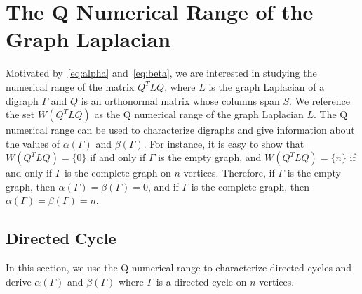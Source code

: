 \documentclass{article}
\theoremstyle{definition}
\begin{document}
\section{The Q Numerical Range of the Graph Laplacian}
Motivated by~\eqref{eq:alpha} and~\eqref{eq:beta}, we are interested in studying the numerical range of the matrix $Q^{T}LQ$, where $L$ is the graph Laplacian of a digraph $\Gamma$ and $Q$ is an orthonormal matrix whose columns span $S$.
We reference the set $W(Q^{T}LQ)$ as the Q numerical range of the graph Laplacian $L$.
The Q numerical range can be used to characterize digraphs and give information about the values of $\alpha(\Gamma)$ and $\beta(\Gamma)$.
For instance, it is easy to show that $W(Q^{T}LQ)=\{0\}$ if and only if $\Gamma$ is the empty graph, and $W(Q^{T}LQ)=\{n\}$ if and only if $\Gamma$ is the complete graph on $n$ vertices.
Therefore, if $\Gamma$ is the empty graph, then $\alpha(\Gamma)=\beta(\Gamma)=0$, and if $\Gamma$ is the complete graph, then $\alpha(\Gamma)=\beta(\Gamma)=n$. 

\subsection{Directed Cycle}
In this section, we use the Q numerical range to characterize directed cycles and derive $\alpha(\Gamma)$ and $\beta(\Gamma)$ where $\Gamma$ is a directed cycle on $n$ vertices.
\end{document}
